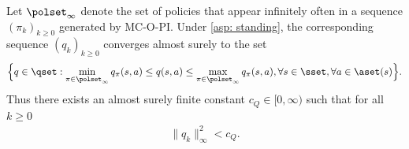 


\begin{lemma}
\label{thm: bounded limit sets}
Let $\polset_\infty$ denote the set of policies that appear infinitely often in a sequence $(\pi_k)_{k \ge 0}$ generated by MC-O-PI.
Under \autoref{asp: standing}, the corresponding sequence $(q_k)_{k \ge 0}$ converges almost surely to the set
\begin{align*}
    \Big\{
    q \in \qset : 
    \min_{\pi \in \polset_\infty} q_\pi(s,a) \leq q(s,a) \leq \max_{\pi \in \polset_\infty} q_\pi(s,a), \forall s \in \sset, \forall a \in \aset(s)
    \Big\} .
\end{align*}
Thus
there exists an almost surely finite constant $c_Q \in [0, \infty)$ such that for all $k \geq 0$
    \begin{align*}
        \| q_k \|_\infty^2 < c_Q .
    \end{align*}
\end{lemma}


